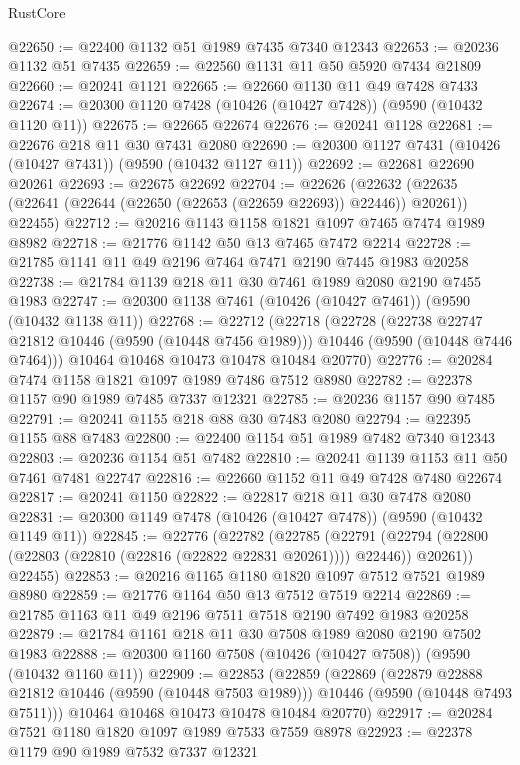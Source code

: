 \begin{lexlean}{RustCore}
\begin{coremodule}
@22650 := @22400 @1132 @51 @1989 @7435 @7340 @12343
@22653 := @20236 @1132 @51 @7435
@22659 := @22560 @1131 @11 @50 @5920 @7434 @21809
@22660 := @20241 @1121
@22665 := @22660 @1130 @11 @49 @7428 @7433
@22674 := @20300 @1120 @7428 (@10426 (@10427 @7428)) (@9590 (@10432 @1120 @11))
@22675 := @22665 @22674
@22676 := @20241 @1128
@22681 := @22676 @218 @11 @30 @7431 @2080
@22690 := @20300 @1127 @7431 (@10426 (@10427 @7431)) (@9590 (@10432 @1127 @11))
@22692 := @22681 @22690 @20261
@22693 := @22675 @22692
@22704 := @22626
    (@22632 (@22635 (@22641 (@22644 (@22650 (@22653 (@22659 @22693)) @22446)) @20261)) @22455)
@22712 := @20216 @1143 @1158 @1821 @1097 @7465 @7474 @1989 @8982
@22718 := @21776 @1142 @50 @13 @7465 @7472 @2214
@22728 := @21785 @1141 @11 @49 @2196 @7464 @7471 @2190 @7445 @1983 @20258
@22738 := @21784 @1139 @218 @11 @30 @7461 @1989 @2080 @2190 @7455 @1983
@22747 := @20300 @1138 @7461 (@10426 (@10427 @7461)) (@9590 (@10432 @1138 @11))
@22768 := @22712
    (@22718
      (@22728
        (@22738 @22747 @21812 @10446 (@9590 (@10448 @7456 @1989)))
        @10446
        (@9590 (@10448 @7446 @7464)))
      @10464
      @10468
      @10473
      @10478
      @10484
      @20770)
@22776 := @20284 @7474 @1158 @1821 @1097 @1989 @7486 @7512 @8980
@22782 := @22378 @1157 @90 @1989 @7485 @7337 @12321
@22785 := @20236 @1157 @90 @7485
@22791 := @20241 @1155 @218 @88 @30 @7483 @2080
@22794 := @22395 @1155 @88 @7483
@22800 := @22400 @1154 @51 @1989 @7482 @7340 @12343
@22803 := @20236 @1154 @51 @7482
@22810 := @20241 @1139 @1153 @11 @50 @7461 @7481 @22747
@22816 := @22660 @1152 @11 @49 @7428 @7480 @22674
@22817 := @20241 @1150
@22822 := @22817 @218 @11 @30 @7478 @2080
@22831 := @20300 @1149 @7478 (@10426 (@10427 @7478)) (@9590 (@10432 @1149 @11))
@22845 := @22776
    (@22782
      (@22785
        (@22791 (@22794 (@22800 (@22803 (@22810 (@22816 (@22822 @22831 @20261)))) @22446)) @20261))
      @22455)
@22853 := @20216 @1165 @1180 @1820 @1097 @7512 @7521 @1989 @8980
@22859 := @21776 @1164 @50 @13 @7512 @7519 @2214
@22869 := @21785 @1163 @11 @49 @2196 @7511 @7518 @2190 @7492 @1983 @20258
@22879 := @21784 @1161 @218 @11 @30 @7508 @1989 @2080 @2190 @7502 @1983
@22888 := @20300 @1160 @7508 (@10426 (@10427 @7508)) (@9590 (@10432 @1160 @11))
@22909 := @22853
    (@22859
      (@22869
        (@22879 @22888 @21812 @10446 (@9590 (@10448 @7503 @1989)))
        @10446
        (@9590 (@10448 @7493 @7511)))
      @10464
      @10468
      @10473
      @10478
      @10484
      @20770)
@22917 := @20284 @7521 @1180 @1820 @1097 @1989 @7533 @7559 @8978
@22923 := @22378 @1179 @90 @1989 @7532 @7337 @12321

\end{coremodule}
\end{lexlean}

